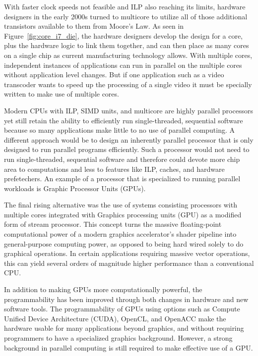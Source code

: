 \documentclass{JINST}
\begin{document}
With faster clock speeds not feasible and ILP also reaching its limits, hardware designers in the early 2000s turned to multicore to utilize all of those additional transistors available to them from Moore's Law.  As seen in Figure~\ref{fig:core_i7_die}, the hardware designers develop the design for a core, plus the hardware logic to link them together, and can then place as many cores on a single chip as current manufacturing technology allows.  With multiple cores, independent instances of applications can run in parallel on the multiple cores without application level changes.  But if one application such as a video transcoder wants to speed up the processing of a single video it must be specially written to make use of multiple cores.

Modern CPUs with ILP, SIMD units, and multicore are highly parallel processors yet still retain the ability to efficiently run single-threaded, sequential software because so many applications make little to no use of parallel computing.  A different approach would be to design an inherently parallel processor that is only designed to run parallel programs efficiently.  Such a processor would not need to run single-threaded, sequential software and therefore could devote more chip area to computations and less to features like ILP, caches, and hardware prefetechers.  An example of a processor that is specialized to running parallel workloads is Graphic Processor Units (GPUs).

The final rising alternative was the use of systems consisting processors with multiple cores integrated with Graphics processing units (GPU) as a modified form 
of stream processor. This concept turns the massive floating-point computational power of a modern graphics accelerator's shader 
pipeline into general-purpose computing power, as opposed to being hard wired solely to do graphical operations. In certain 
applications requiring massive vector operations, this can yield several orders of magnitude higher performance than a conventional CPU.

In addition to making GPUs more computationally powerful, the programmability has been improved through both changes in hardware and new software tools.  The programmability of GPUs using options such as Compute Unified Device Architecture (CUDA), OpenCL, and OpenACC make the hardware usable for many applications beyond graphics, and without requiring programmers to have a specialized graphics background.  However, a strong background in parallel computing is still required to make effective use of a GPU.
\end{document}
